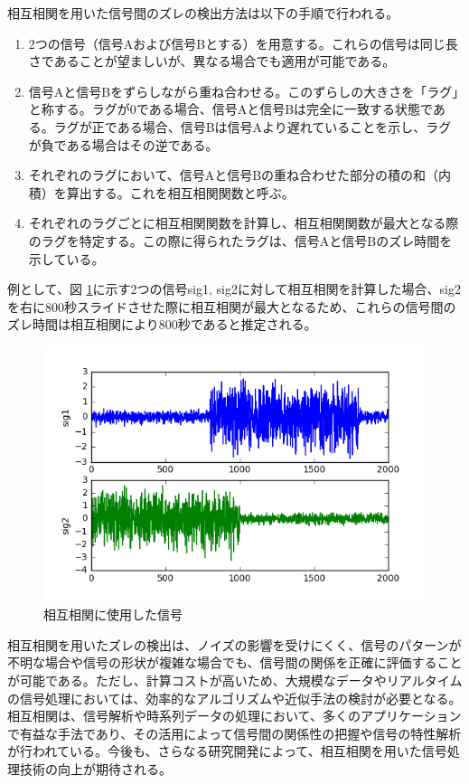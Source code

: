 \documentclass[a4j,12pt,]{jarticle}
\begin{document}
相互相関を用いた信号間のズレの検出方法は以下の手順で行われる。

\begin{enumerate}
\item 2つの信号（信号Aおよび信号Bとする）を用意する。これらの信号は同じ長さであることが望ましいが、異なる場合でも適用が可能である。
\item 信号Aと信号Bをずらしながら重ね合わせる。このずらしの大きさを「ラグ」と称する。ラグが0である場合、信号Aと信号Bは完全に一致する状態である。ラグが正である場合、信号Bは信号Aより遅れていることを示し、ラグが負である場合はその逆である。
\item それぞれのラグにおいて、信号Aと信号Bの重ね合わせた部分の積の和（内積）を算出する。これを相互相関関数と呼ぶ。
\item それぞれのラグごとに相互相関関数を計算し、相互相関関数が最大となる際のラグを特定する。この際に得られたラグは、信号Aと信号Bのズレ時間を示している。
\end{enumerate}

例として、図 \ref{p1}に示す2つの信号sig1, sig2に対して相互相関を計算した場合、sig2を右に800秒スライドさせた際に相互相関が最大となるため、これらの信号間のズレ時間は相互相関により800秒であると推定される。

\begin{figure}[H]
  \begin{center}
    \includegraphics[width=160mm]{1.png}
    \caption{相互相関に使用した信号}
    \label{p1}
  \end{center}
\end{figure}

相互相関を用いたズレの検出は、ノイズの影響を受けにくく、信号のパターンが不明な場合や信号の形状が複雑な場合でも、信号間の関係を正確に評価することが可能である。ただし、計算コストが高いため、大規模なデータやリアルタイムの信号処理においては、効率的なアルゴリズムや近似手法の検討が必要となる。相互相関は、信号解析や時系列データの処理において、多くのアプリケーションで有益な手法であり、その活用によって信号間の関係性の把握や信号の特性解析が行われている。今後も、さらなる研究開発によって、相互相関を用いた信号処理技術の向上が期待される。
\end{document}
